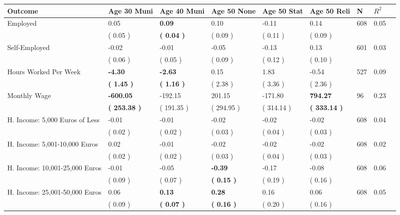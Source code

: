 \begin{tabular}{L{6.2cm} C{1.8cm} C{1.8cm} C{1.8cm} C{1.8cm} C{1.8cm} C{1.8cm} C{0.3cm} C{0.3cm}}
\toprule
 \textbf{Outcome} & \textbf{Age 30 Muni} & \textbf{Age 40 Muni} & \textbf{Age 50 None} & \textbf{Age 50 Stat} & \textbf{Age 50 Reli} & \textbf{N} & \textbf{$ R^2$} \\
\midrule
Employed &      0.05 & \textbf{     0.09} &      0.10 &     -0.11 &      0.14  & 608 &       0.05 \\ 
 & (     0.05 ) & \textbf{(     0.04 )} & (     0.09 ) & (     0.11 ) & (     0.09 )  & \\
Self-Employed &     -0.02 &     -0.01 &     -0.05 &     -0.13 &      0.13  & 601 &       0.03 \\ 
 & (     0.06 ) & (     0.05 ) & (     0.09 ) & (     0.12 ) & (     0.10 )  & \\
Hours Worked Per Week & \textbf{    -4.30} & \textbf{    -2.63} &      0.15 &      1.83 &     -0.54  & 527 &       0.09 \\ 
 & \textbf{(     1.45 )} & \textbf{(     1.16 )} & (     2.38 ) & (     3.36 ) & (     2.36 )  & \\
Monthly Wage & \textbf{  -600.05} &   -192.15 &    201.15 &   -171.80 & \textbf{   794.27}  & 96 &       0.23 \\ 
 & \textbf{(   253.38 )} & (   191.35 ) & (   294.95 ) & (   314.14 ) & \textbf{(   333.14 )}  & \\
H. Income: 5,000 Euros of Less &     -0.01 &     -0.01 &     -0.02 &     -0.02 &     -0.02  & 608 &       0.04 \\ 
 & (     0.02 ) & (     0.02 ) & (     0.03 ) & (     0.04 ) & (     0.03 )  & \\
H. Income: 5,001-10,000 Euros &      0.02 &     -0.01 &     -0.02 &     -0.02 &     -0.02  & 608 &       0.02 \\ 
 & (     0.02 ) & (     0.02 ) & (     0.03 ) & (     0.04 ) & (     0.03 )  & \\
H. Income: 10,001-25,000 Euros &     -0.01 &     -0.05 & \textbf{    -0.39} &     -0.17 &     -0.08  & 608 &       0.06 \\ 
 & (     0.09 ) & (     0.07 ) & \textbf{(     0.15 )} & (     0.19 ) & (     0.16 )  & \\
H. Income: 25,001-50,000 Euros &      0.06 & \textbf{     0.13} & \textbf{     0.28} &      0.16 &      0.06  & 608 &       0.05 \\ 
 & (     0.09 ) & \textbf{(     0.07 )} & \textbf{(     0.16 )} & (     0.20 ) & (     0.16 )  & \\

\end{tabular}
